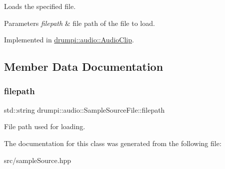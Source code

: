 Loads the specified file. 
\begin{DoxyParams}{Parameters}
{\em filepath} & file path of the file to load. \\
\hline
\end{DoxyParams}


Implemented in \hyperlink{classdrumpi_1_1audio_1_1AudioClip_af00b5d353bec63b6bbbbe58509b95fe3}{drumpi\+::audio\+::\+Audio\+Clip}.



\subsection{Member Data Documentation}
\mbox{\label{classdrumpi_1_1audio_1_1SampleSourceFile_a0d6461310f720bf9a25e7c274f57053b}} 
\subsubsection{\texorpdfstring{filepath}{filepath}}
{\footnotesize\ttfamily std\+::string drumpi\+::audio\+::\+Sample\+Source\+File\+::filepath\hspace{0.3cm}{\ttfamily [protected]}}

File path used for loading. 

The documentation for this class was generated from the following file\+:\begin{DoxyCompactItemize}
\item 
src/sample\+Source.\+hpp\end{DoxyCompactItemize}
